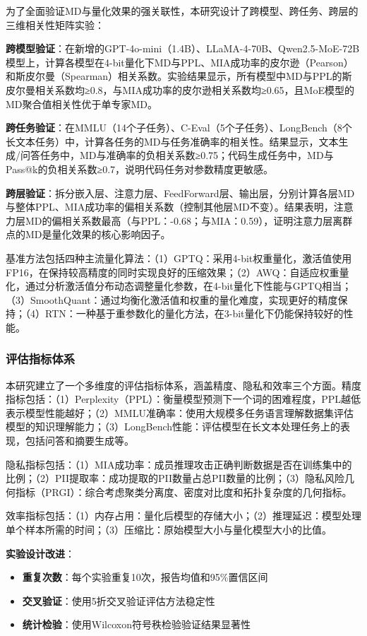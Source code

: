 为了全面验证MD与量化效果的强关联性，本研究设计了跨模型、跨任务、跨层的三维相关性矩阵实验：

\textbf{跨模型验证}：在新增的GPT-4o-mini（1.4B）、LLaMA-4-70B、Qwen2.5-MoE-72B模型上，计算各模型在4-bit量化下MD与PPL、MIA成功率的皮尔逊（Pearson）和斯皮尔曼（Spearman）相关系数。实验结果显示，所有模型中MD与PPL的斯皮尔曼相关系数均≥0.8，与MIA成功率的皮尔逊相关系数均≥0.65，且MoE模型的MD聚合值相关性优于单专家MD。

\textbf{跨任务验证}：在MMLU（14个子任务）、C-Eval（5个子任务）、LongBench（8个长文本任务）中，计算各任务的MD与任务准确率的相关性。结果显示，文本生成/问答任务中，MD与准确率的负相关系数≥0.75；代码生成任务中，MD与Pass@k的负相关系数≥0.7，说明代码任务对参数精度更敏感。

\textbf{跨层验证}：拆分嵌入层、注意力层、FeedForward层、输出层，分别计算各层MD与整体PPL、MIA成功率的偏相关系数（控制其他层MD不变）。结果表明，注意力层MD的偏相关系数最高（与PPL：-0.68；与MIA：0.59），证明注意力层离群点的MD是量化效果的核心影响因子。

基准方法包括四种主流量化算法：（1）GPTQ：采用4-bit权重量化，激活值使用FP16，在保持较高精度的同时实现良好的压缩效果；（2）AWQ：自适应权重量化，通过分析激活值分布动态调整量化参数，在4-bit量化下性能与GPTQ相当；（3）SmoothQuant：通过均衡化激活值和权重的量化难度，实现更好的精度保持；（4）RTN：一种基于重参数化的量化方法，在3-bit量化下仍能保持较好的性能。

\subsubsection{评估指标体系}

本研究建立了一个多维度的评估指标体系，涵盖精度、隐私和效率三个方面。精度指标包括：（1）Perplexity（PPL）：衡量模型预测下一个词的困难程度，PPL越低表示模型性能越好；（2）MMLU准确率：使用大规模多任务语言理解数据集评估模型的知识理解能力；（3）LongBench性能：评估模型在长文本处理任务上的表现，包括问答和摘要生成等。

隐私指标包括：（1）MIA成功率：成员推理攻击正确判断数据是否在训练集中的比例；（2）PII提取率：成功提取的PII数量占总PII数量的比例；（3）隐私风险几何指标（PRGI）：综合考虑聚类分离度、密度对比度和拓扑复杂度的几何指标。

效率指标包括：（1）内存占用：量化后模型的存储大小；（2）推理延迟：模型处理单个样本所需的时间；（3）压缩比：原始模型大小与量化模型大小的比值。

\textbf{实验设计改进}：
\begin{itemize}
\item \textbf{重复次数}：每个实验重复10次，报告均值和95\%置信区间
\item \textbf{交叉验证}：使用5折交叉验证评估方法稳定性
\item \textbf{统计检验}：使用Wilcoxon符号秩检验验证结果显著性
\end{itemize}

